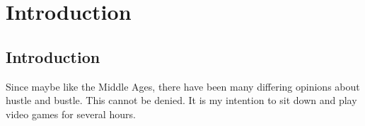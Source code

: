 \chapter{Introduction}
\label{sec:introduction}

\section{Introduction}
Since maybe like the Middle Ages, there have been many differing opinions about
hustle and bustle. This cannot be denied. It is my intention to sit down and
play video games for several hours.
